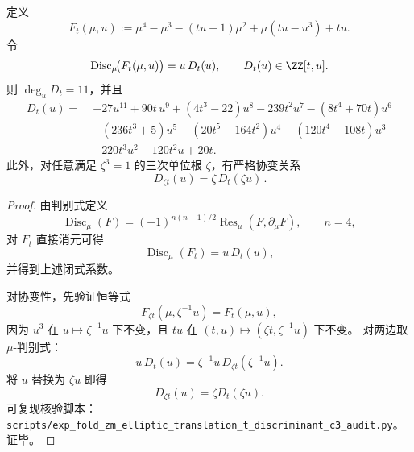 \begin{theorem}\label{thm:xi-terminal-zm-translation-t-branch-discriminant-c3-closed}
定义
\[
F_t(\mu,u):=\mu^4-\mu^3-(tu+1)\mu^2+\mu(tu-u^3)+tu.
\]
令
\[
\operatorname{Disc}_{\mu}\!\bigl(F_t(\mu,u)\bigr)=u\,D_t(u),
\qquad D_t(u)\in\ZZ[t,u].
\]
则 \(\deg_u D_t=11\)，并且
\[
\boxed{
\begin{aligned}
D_t(u)=\;&-27u^{11}+90t\,u^9+(4t^3-22)u^8-239t^2u^7-(8t^4+70t)u^6\\
&+(236t^3+5)u^5+(20t^5-164t^2)u^4-(120t^4+108t)u^3\\
&+220t^3u^2-120t^2u+20t.
\end{aligned}}
\]
此外，对任意满足 \(\zeta^3=1\) 的三次单位根 \(\zeta\)，有严格协变关系
\[
\boxed{\,D_{\zeta t}(u)=\zeta\,D_t(\zeta u)\, }.
\]
\end{theorem}
\begin{proof}
由判别式定义
\[
\operatorname{Disc}_{\mu}(F)=(-1)^{n(n-1)/2}\operatorname{Res}_{\mu}(F,\partial_{\mu}F),\qquad n=4,
\]
对 \(F_t\) 直接消元可得
\[
\operatorname{Disc}_{\mu}(F_t)=u\,D_t(u),
\]
并得到上述闭式系数。
\par
对协变性，先验证恒等式
\[
F_{\zeta t}(\mu,\zeta^{-1}u)=F_t(\mu,u),
\]
因为 \(u^3\) 在 \(u\mapsto \zeta^{-1}u\) 下不变，且 \(tu\) 在 \((t,u)\mapsto(\zeta t,\zeta^{-1}u)\) 下不变。
对两边取 \(\mu\)-判别式：
\[
u\,D_t(u)=\zeta^{-1}u\,D_{\zeta t}(\zeta^{-1}u).
\]
将 \(u\) 替换为 \(\zeta u\) 即得
\[
D_{\zeta t}(u)=\zeta D_t(\zeta u).
\]
可复现核验脚本：\texttt{scripts/exp\_fold\_zm\_elliptic\_translation\_t\_discriminant\_c3\_audit.py}。证毕。
\end{proof}

